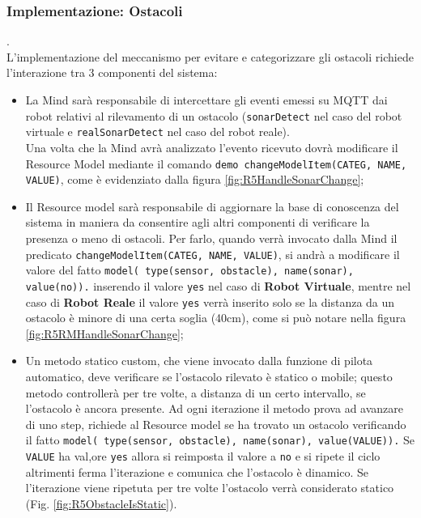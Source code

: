 \documentclass{llncs}
\begin{document}
\subsubsection{Implementazione: Ostacoli}.
\label{ImplementazioneOstacoliReq5}
\vspace*{1ex}
\\
L'implementazione del meccanismo per evitare e categorizzare gli ostacoli richiede l'interazione tra 3 componenti del sistema:
\begin{itemize}
    \item La Mind sar\`a responsabile di intercettare gli eventi emessi su MQTT dai robot relativi al rilevamento di un ostacolo (\texttt{sonarDetect} nel caso del robot virtuale e \texttt{realSonarDetect} nel caso del robot reale).\\
    Una volta che la Mind avr\`a analizzato l'evento ricevuto dovr\`a modificare il Resource Model mediante il comando \texttt{demo changeModelItem(CATEG, NAME, VALUE)}, come \`e evidenziato dalla figura \hyperref[fig:R5HandleSonarChange]{\ref{fig:R5HandleSonarChange}};
    \item Il Resource model sar\`a responsabile di aggiornare la base di conoscenza del sistema in maniera da consentire agli altri componenti di verificare la presenza o meno di ostacoli. Per farlo, quando verr\`a invocato dalla Mind il predicato \texttt{changeModelItem(CATEG, NAME, VALUE)}, si andr\`a a modificare il valore del fatto \texttt{model( type(sensor, obstacle), name(sonar), value(no)).} inserendo il valore \texttt{yes} nel caso di \textbf{Robot Virtuale}, mentre nel caso di \textbf{Robot Reale} il valore \texttt{yes} verr\`a inserito solo se la distanza da un ostacolo \`e minore di una certa soglia (40cm), come si pu\`o notare nella figura \hyperref[fig:R5RMHandleSonarChange]{\ref{fig:R5RMHandleSonarChange}};
    \item Un metodo statico custom, che viene invocato dalla funzione di pilota automatico, deve verificare se l'ostacolo rilevato \`e statico o mobile; questo metodo controller\`a per tre volte, a distanza di un certo intervallo, se l'ostacolo \`e ancora presente. Ad ogni iterazione il metodo prova ad avanzare di uno step, richiede al Resource model se ha trovato un ostacolo verificando il fatto \texttt{model( type(sensor, obstacle), name(sonar), value(VALUE)).} Se \texttt{VALUE} ha val,ore \texttt{yes} allora si reimposta il valore a \texttt{no} e si ripete il ciclo altrimenti ferma l'iterazione e comunica che l'ostacolo \`e dinamico. Se l'iterazione viene ripetuta per tre volte l'ostacolo verr\`a considerato statico (Fig. \hyperref[fig:R5ObstacleIsStatic]{\ref{fig:R5ObstacleIsStatic}}).
\end{itemize}
\end{document}
